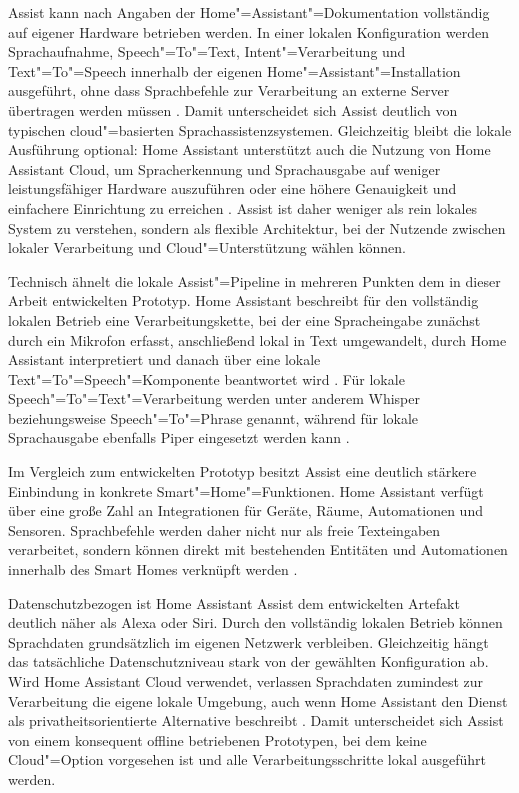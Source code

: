 Assist kann nach Angaben der Home"=Assistant"=Dokumentation vollständig auf eigener Hardware betrieben werden. In einer lokalen Konfiguration werden Sprachaufnahme, Speech"=To"=Text, Intent"=Verarbeitung und Text"=To"=Speech innerhalb der eigenen Home"=Assistant"=Installation ausgeführt, ohne dass Sprachbefehle zur Verarbeitung an externe Server übertragen werden müssen \autocite{Assist-Documentation}. Damit unterscheidet sich Assist deutlich von typischen cloud"=basierten Sprachassistenzsystemen. Gleichzeitig bleibt die lokale Ausführung optional: Home Assistant unterstützt auch die Nutzung von Home Assistant Cloud, um Spracherkennung und Sprachausgabe auf weniger leistungsfähiger Hardware auszuführen oder eine höhere Genauigkeit und einfachere Einrichtung zu erreichen \autocite{Assist-Documentation}. Assist ist daher weniger als rein lokales System zu verstehen, sondern als flexible Architektur, bei der Nutzende zwischen lokaler Verarbeitung und Cloud"=Unterstützung wählen können.

Technisch ähnelt die lokale Assist"=Pipeline in mehreren Punkten dem in dieser Arbeit entwickelten Prototyp. Home Assistant beschreibt für den vollständig lokalen Betrieb eine Verarbeitungskette, bei der eine Spracheingabe zunächst durch ein Mikrofon erfasst, anschließend lokal in Text umgewandelt, durch Home Assistant interpretiert und danach über eine lokale Text"=To"=Speech"=Komponente beantwortet wird \autocite{Assist-Documentation}. Für lokale Speech"=To"=Text"=Verarbeitung werden unter anderem Whisper beziehungsweise Speech"=To"=Phrase genannt, während für lokale Sprachausgabe ebenfalls Piper eingesetzt werden kann \autocite{Assist-Documentation}.

Im Vergleich zum entwickelten Prototyp besitzt Assist eine deutlich stärkere Einbindung in konkrete Smart"=Home"=Funktionen. Home Assistant verfügt über eine große Zahl an Integrationen für Geräte, Räume, Automationen und Sensoren. Sprachbefehle werden daher nicht nur als freie Texteingaben verarbeitet, sondern können direkt mit bestehenden Entitäten und Automationen innerhalb des Smart Homes verknüpft werden \autocite{Assist-Documentation}.

Datenschutzbezogen ist Home Assistant Assist dem entwickelten Artefakt deutlich näher als Alexa oder Siri. Durch den vollständig lokalen Betrieb können Sprachdaten grundsätzlich im eigenen Netzwerk verbleiben. Gleichzeitig hängt das tatsächliche Datenschutzniveau stark von der gewählten Konfiguration ab. Wird Home Assistant Cloud verwendet, verlassen Sprachdaten zumindest zur Verarbeitung die eigene lokale Umgebung, auch wenn Home Assistant den Dienst als privatheitsorientierte Alternative beschreibt \autocite{Assist-Documentation}. Damit unterscheidet sich Assist von einem konsequent offline betriebenen Prototypen, bei dem keine Cloud"=Option vorgesehen ist und alle Verarbeitungsschritte lokal ausgeführt werden.

